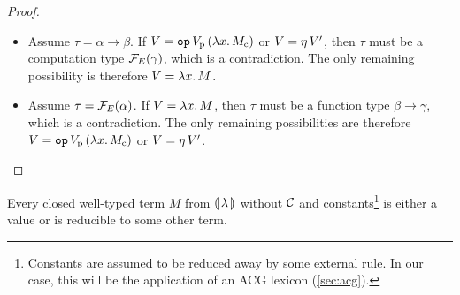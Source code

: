 \begin{proof}\hspace{1cm}

  \begin{itemize}
  \item Assume $\tau = \alpha \to \beta$. If
    $V = \mathtt{op}\,V_{\mathrm{p}}\,(\lambda x.\, M_{\mathrm{c}})$ or
    $V = \eta\,V'$, then $\tau$ must be a computation type
    $\mathcal{F}_E(\gamma)$, which is a contradiction. The only remaining
    possibility is therefore $V = \lambda x.\, M$.
  \item Assume $\tau = \mathcal{F}_E(\alpha)$. If $V = \lambda x.\, M$, then $\tau$
    must be a function type $\beta \to \gamma$, which is a
    contradiction. The only remaining possibilities are therefore
    $V = \mathtt{op}\,V_{\mathrm{p}}\,(\lambda x.\, M_{\mathrm{c}})$ or
    $V = \eta\,V'$.
  \end{itemize}
\end{proof}

\begin{property}\label{prop:progress}

  Every closed well-typed term $M$ from $\llparenthesis \, \lambda \, \rrparenthesis$ without $\mathcal{C}$
  and constants\footnote{Constants are assumed to be reduced away by some
    external rule. In our case, this will be the application of an ACG
    lexicon (\ref{sec:acg}).} is either a value or is reducible to some
  other term.
\end{property}

